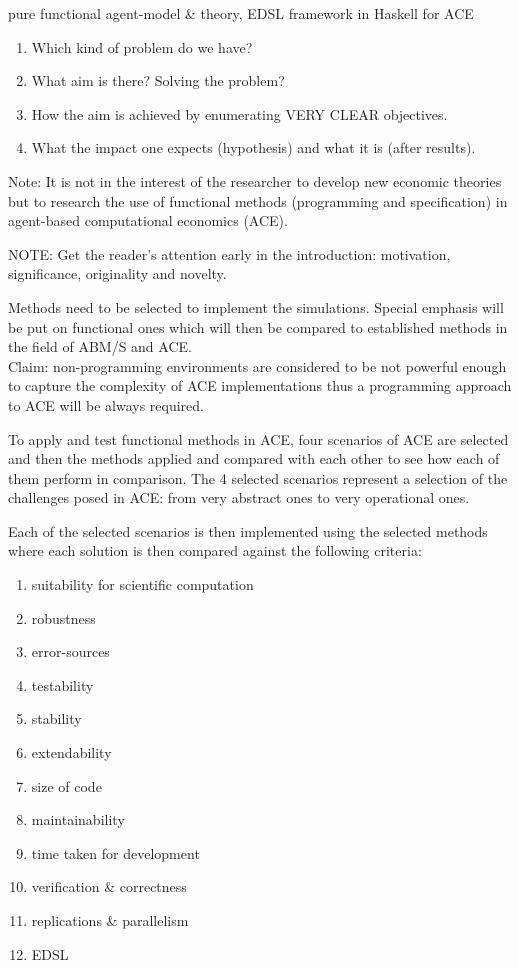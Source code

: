 pure functional agent-model \& theory, EDSL framework in Haskell for ACE

\begin{enumerate}
\item Which kind of problem do we have?
\item What aim is there? Solving the problem? 
\item How the aim is achieved by enumerating VERY CLEAR objectives.
\item What the impact one expects (hypothesis) and what it is (after results).
\end{enumerate}

Note: It is not in the interest of the researcher to develop new economic theories but to research the use of functional methods (programming and specification) in agent-based computational economics (ACE).

NOTE: Get the reader’s attention early in the introduction: motivation, significance, originality and novelty.

Methods need to be selected to implement the simulations. Special emphasis will be put on functional ones which will then be compared to established methods in the field of ABM/S and ACE. \\

Claim: non-programming environments are considered to be not powerful enough to capture the complexity of ACE implementations thus a programming approach to ACE will be always required.


To apply and test functional methods in ACE, four scenarios of ACE are selected and then the methods applied and compared with each other to see how each of them perform in comparison. The 4 selected scenarios represent a selection of the challenges posed in ACE: from very abstract ones to very operational ones.

Each of the selected scenarios is then implemented using the selected methods where each solution is then compared against the following criteria: 

\begin{enumerate}
\item suitability for scientific computation
\item robustness
\item error-sources
\item testability
\item stability
\item extendability
\item size of code
\item maintainability
\item time taken for development
\item verification \& correctness
\item replications \& parallelism
\item EDSL
\end{enumerate}

